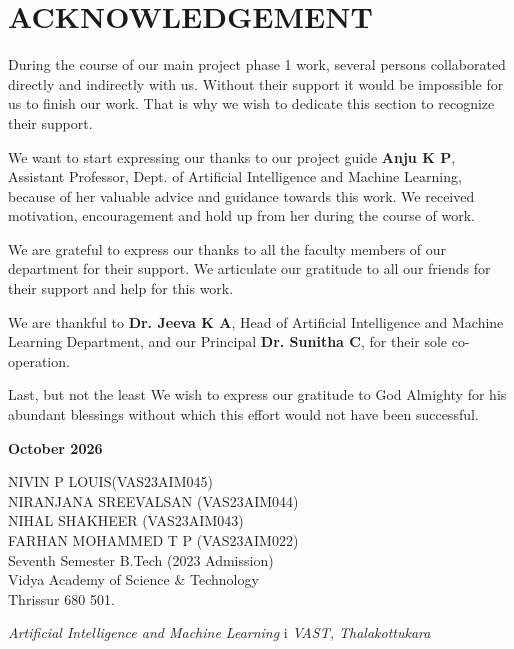 \chapter*{ACKNOWLEDGEMENT}


During the course of our main project phase 1 work, several persons collaborated directly and indirectly with us. Without their support it would be impossible for us to finish our work. That is why we wish to dedicate this section to recognize their support.
\vspace{1em}

We want to start expressing our thanks to our project guide \textbf{Anju K P}, Assistant Professor, Dept. of Artificial Intelligence and Machine Learning, because of her valuable advice and guidance towards this work. We received motivation, encouragement and hold up from her during the course of work.

\vspace{1em}
We are grateful to express our thanks to all the faculty members of our department for their support. We articulate our gratitude to all our friends for their support and help for this work.

\vspace{1em}
We are thankful to \textbf{Dr. Jeeva K A}, Head of Artificial Intelligence and Machine Learning Department, and our Principal \textbf{Dr. Sunitha C}, for their sole co-operation.

Last, but not the least We wish to express our gratitude to God Almighty for his abundant blessings without which this effort would not have been successful.

\vspace{1.0in}
\noindent\textbf{October 2026}

\vspace{0.5in}
\noindent NIVIN P LOUIS(VAS23AIM045) \\
NIRANJANA SREEVALSAN (VAS23AIM044) \\
NIHAL SHAKHEER (VAS23AIM043) \\
FARHAN MOHAMMED T P (VAS23AIM022) \\
Seventh Semester B.Tech (2023 Admission) \\
Vidya Academy of Science \& Technology \\
Thrissur 680 501.

\vfill
\noindent\textit{Artificial Intelligence and Machine Learning} \hfill i \hfill \textit{VAST, Thalakottukara}

\newpage
